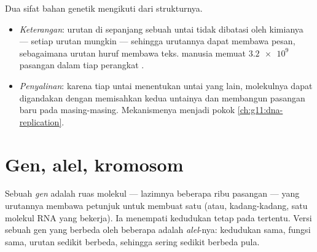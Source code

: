 \begin{proposition}\label{prop:g10:universal-dna:explains}
Dua sifat bahan genetik mengikuti dari strukturnya.
\begin{itemize}
  \item \emph{Keterangan}: urutan  di sepanjang sebuah untai tidak
        dibatasi oleh kimianya --- setiap urutan mungkin --- sehingga
        urutannya dapat membawa pesan, sebagaimana urutan huruf membawa
        teks.  manusia memuat $\num{3.2e9}$ pasangan  dalam tiap
        perangkat .
  \item \emph{Penyalinan}: karena tiap untai menentukan untai yang
        lain, molekulnya dapat digandakan dengan memisahkan kedua
        untainya dan membangun pasangan baru pada masing-masing.
        Mekanismenya menjadi pokok \cref{ch:g11:dna-replication}.
\end{itemize}
\end{proposition}
\admitted

\section{Gen, alel, kromosom}

\begin{definition}\label{def:g10:universal-dna:gene}
Sebuah \emph{gen} adalah ruas molekul  --- lazimnya
beberapa ribu pasangan  --- yang urutannya membawa petunjuk untuk
membuat satu  (atau, kadang-kadang, satu molekul RNA yang
bekerja). Ia menempati kedudukan tetap pada  tertentu. Versi
sebuah gen yang berbeda oleh beberapa  adalah
\emph{alel}-nya: kedudukan sama, fungsi sama, urutan sedikit
berbeda, sehingga sering  sedikit berbeda pula.
\end{definition}

